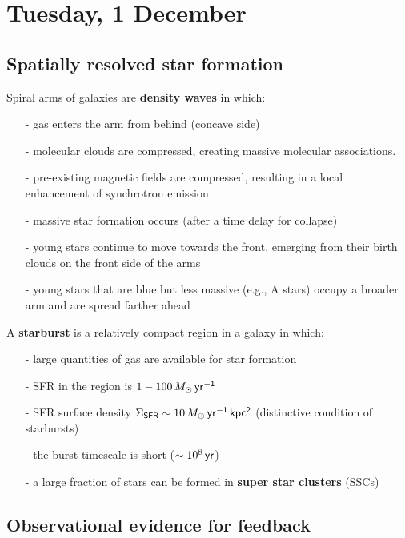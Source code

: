 \documentclass{tufte-handout}
\renewcommand{\textbf}[1]{{\bf \textcolor{dark-gray}{#1}}}
\renewcommand{\rm}{\sf}
\begin{document}
\section{Tuesday, 1 December}
\subsection{Spatially resolved star formation}

\noindent Spiral arms of galaxies are \textbf{density waves} in which:
\begin{itemize}
\item[-] gas enters the arm from behind (concave side)
\item[-] molecular clouds are compressed, creating massive molecular associations.
\item[-] pre-existing magnetic fields are compressed, resulting in a local enhancement of synchrotron emission
\item[-] massive star formation occurs (after a time delay for collapse)
\item[-] young stars continue to move towards the front, emerging from their birth clouds on the front side of the arms 
\item[-] young stars that are blue but less massive (e.g., A stars) occupy a broader arm and are spread farther ahead
\end{itemize}

\noindent A \textbf{starburst} is a relatively compact region in a galaxy in which:
\begin{itemize}
\item[-] large quantities of gas are available for star formation
\item[-] SFR in the region is $1-100\, M_\odot\,\rm yr^{-1}$
\item[-] SFR surface density $\Sigma_{\rm SFR} \sim 10\, M_\odot\,\rm yr^{-1}\, kpc^{2}$ (distinctive condition of starbursts)
\item[-] the burst timescale is short ($\sim 10^8\, \rm yr$)
\item[-] a large fraction of stars can be formed in \textbf{super star clusters} (SSCs)
\end{itemize}

\subsection{Observational evidence for feedback}
\end{document}
